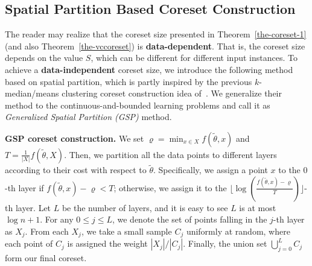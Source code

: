 \documentclass{article}
\begin{document}
\subsection{Spatial Partition Based Coreset Construction}\label{GSP}
The reader may realize that the coreset size presented in Theorem~\ref{the-coreset-1} (and also Theorem~\ref{the-vccoreset}) is \textbf{data-dependent}. That is, the coreset size depends on the value $S$, which can be different for different input instances. To achieve a \textbf{data-independent} coreset size, we introduce the following method based on spatial partition, which is partly inspired by the previous $k$-median/means clustering coreset construction idea of~\cite{Chen09,DBLP:conf/icml/DingW20,DBLP:conf/icml/HuangHLFD21}.   
We generalize their method to the continuous-and-bounded learning problems and call it as {\em Generalized Spatial Partition (GSP)} method. 


\textbf{GSP coreset construction.} We set $ \varrho=\min_{x\in X} f(\tilde{\theta},x) $ and $ T = \frac{1}{|X|}f(\tilde{\theta},X) $. Then,
we partition all the data points to different layers according to their cost with respect to $ \tilde{\theta} $. Specifically, we assign a point $ x $ to the   $0$-th layer if $ f(\tilde{\theta},x)-\varrho< T $; otherwise, we assign it to the $ \lfloor\log ( \frac{f(\tilde{\theta},x)-\varrho}{T}) \rfloor$-th layer. Let $L$ be the number of layers, and it is easy to see $ L $ is at most $\log n+1$. For any $0\leq j\leq L$, we denote the set of points falling in the $j$-th layer as $X_j$. From each $X_j$, we take a small sample $C_j$ uniformly at random, where each point of $C_j$ is assigned the weight $ |X_j|/|C_j| $. Finally, the union set $\bigcup^L_{j=0} C_j$ form our final coreset. 



\end{document}
